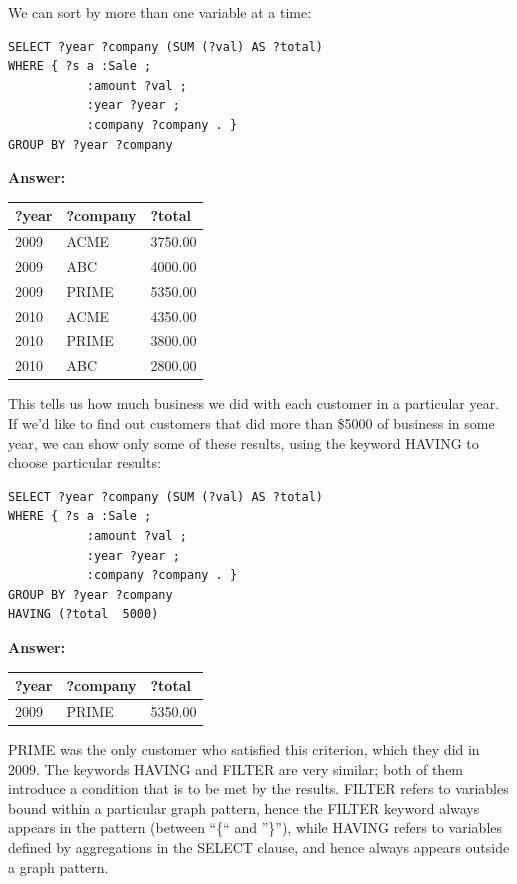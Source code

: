 We can sort by more than one variable at a time:


\begin{lstlisting}
SELECT ?year ?company (SUM (?val) AS ?total)
WHERE { ?s a :Sale ;
           :amount ?val ;
           :year ?year ;
           :company ?company . }
GROUP BY ?year ?company
\end{lstlisting}

\textbf{\textbf{Answer:}}

\begin{tabular}{|lll|}
\hline
?year&?company&?total\\
\hline
2009&ACME&3750.00\\
2009&ABC&4000.00\\
2009&PRIME&5350.00\\
2010&ACME&4350.00\\
2010&PRIME&3800.00\\
2010&ABC&2800.00\\
\hline
\end{tabular}

This tells us how much business we did with each customer in a
particular year. If we'd like to find out customers that did more than
\$5000 of business in some year, we can show only some of these results,
using the keyword HAVING to choose particular results:


\begin{lstlisting}
SELECT ?year ?company (SUM (?val) AS ?total)
WHERE { ?s a :Sale ;
           :amount ?val ;
           :year ?year ;
           :company ?company . }
GROUP BY ?year ?company
HAVING (?total  5000)
\end{lstlisting}

\textbf{\textbf{Answer:}}

\begin{tabular}{|lll|}
\hline
?year&?company&?total\\
\hline
2009&PRIME&5350.00\\
\hline
\end{tabular}

PRIME was the only customer who satisfied this criterion, which they did
in 2009. The keywords HAVING and FILTER are very similar; both of them
introduce a condition that is to be met by the results. FILTER refers to
variables bound within a particular graph pattern, hence the FILTER
keyword always appears in the pattern (between ``\{`` and ''\}''), while
HAVING refers to variables defined by aggregations in the SELECT clause,
and hence always appears outside a graph pattern.

